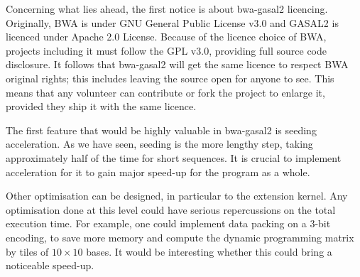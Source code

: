 Concerning what lies ahead, the first notice is about bwa-gasal2 licencing. Originally, BWA is under GNU General Public License v3.0 and GASAL2 is licenced under Apache 2.0 License. Because of the licence choice of BWA, projects including it must follow the GPL v3.0, providing full source code disclosure. It follows that bwa-gasal2 will get the same licence to respect BWA original rights; this includes leaving the source open for anyone to see. This means that any volunteer can contribute or fork the project to enlarge it, provided they ship it with the same licence.

The first feature that would be highly valuable in bwa-gasal2 is seeding acceleration. As we have seen, seeding is the more lengthy step, taking approximately half of the time for short sequences. It is crucial to implement acceleration for it to gain major speed-up for the program as a whole. 

Other optimisation can be designed, in particular to the extension kernel. Any optimisation done at this level could have serious repercussions on the total execution time. For example, one could implement data packing on a 3-bit encoding, to save more memory and compute the dynamic programming matrix by tiles of $10 \times 10$ bases. It would be interesting whether this could bring a noticeable speed-up.